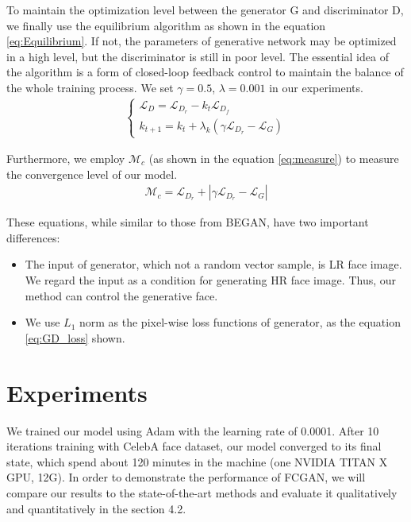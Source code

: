\documentclass[conference,compsoc]{IEEEtran}
\begin{document}
To maintain the optimization level between the generator G and discriminator D, we finally use the equilibrium algorithm\cite{David-BEGAN2017} as shown in the equation \ref{eq:Equilibrium}. If not, the parameters of generative network may be optimized in a high level, but the discriminator is still in poor level. The essential idea of the algorithm is a form of closed-loop feedback control to maintain the balance of the whole training process. We set $\gamma = 0.5$, $\lambda = 0.001$ in our experiments.
\begin{align}\label{eq:Equilibrium}
\begin{cases}
  \mathcal{L}_D = \mathcal{L}_{D_r} - k_t \mathcal{L}_{D_f} \\
  k_{t+1} = k_t + \lambda_k(\gamma \mathcal{L}_{D_r} - \mathcal{L}_G)
\end{cases}
\end{align}

Furthermore, we employ $\mathcal{M}_c$ \cite{David-BEGAN2017} (as shown in the equation \ref{eq:measure}) to measure the convergence level of our model.
\begin{align}\label{eq:measure}
\mathcal{M}_c = \mathcal{L}_{D_r} + |\gamma \mathcal{L}_{D_r}-\mathcal{L}_G|
\end{align}

These equations, while similar to those from BEGAN, have two important differences:
\begin{itemize}
  \item The input of generator, which not a random vector sample, is LR face image. We regard the input as a condition for generating HR face image. Thus, our method can control the generative face.
  \item We use $L_1$ norm as the pixel-wise loss functions of generator, as the equation \ref{eq:GD_loss} shown.
\end{itemize}


\section{Experiments}

We trained our model using Adam with the learning rate of 0.0001. After 10 iterations training with CelebA\cite{liu2015Celeba} face dataset, our model converged to its final state, which spend about 120 minutes in the machine (one NVIDIA TITAN X GPU, 12G). In order to demonstrate the performance of FCGAN, we will compare our results to the state-of-the-art methods\cite{dong2016accelerating, LapSRN_CVPR2017, pix2pix} and evaluate it qualitatively and quantitatively in the section 4.2.
\end{document}

